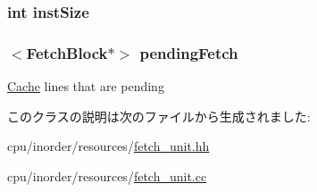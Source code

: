 \hypertarget{classFetchUnit_a494a9a986bc62c946604f9e9047ad237}{
\subsubsection[{instSize}]{\setlength{\rightskip}{0pt plus 5cm}int {\bf instSize}}}
\label{classFetchUnit_a494a9a986bc62c946604f9e9047ad237}
\hypertarget{classFetchUnit_af2a77ef8e6fe01c93bcac28b1152e44b}{
\subsubsection[{pendingFetch}]{$<${\bf FetchBlock}$\ast$$>$ {\bf pendingFetch}}}
\label{classFetchUnit_af2a77ef8e6fe01c93bcac28b1152e44b}
\hyperlink{classCache}{Cache} lines that are pending 

このクラスの説明は次のファイルから生成されました:\begin{DoxyCompactItemize}
\item 
cpu/inorder/resources/\hyperlink{fetch__unit_8hh}{fetch\_\-unit.hh}\item 
cpu/inorder/resources/\hyperlink{fetch__unit_8cc}{fetch\_\-unit.cc}\end{DoxyCompactItemize}
